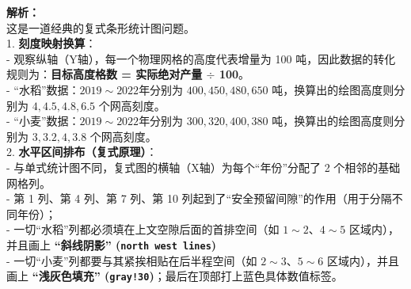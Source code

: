 \begin{center}
\end{center}

\vspace{0.8cm}

{\small\color{gray}
\textbf{解析：}\\
这是一道经典的复式条形统计图问题。\\
1. \textbf{刻度映射换算}：\\
- 观察纵轴（Y轴），每一个物理网格的高度代表增量为 100 吨，因此数据的转化规则为：\textbf{目标高度格数 = 实际绝对产量 $\div$ 100}。\\
- “水稻”数据：$2019\sim 2022$年分别为 $400, 450, 480, 650$ 吨，换算出的绘图高度则分别为 $4, 4.5, 4.8, 6.5$ 个网高刻度。\\
- “小麦”数据：$2019\sim 2022$年分别为 $300, 320, 400, 380$ 吨，换算出的绘图高度则分别为 $3, 3.2, 4, 3.8$ 个网高刻度。\\
2. \textbf{水平区间排布（复式原理）}：\\
- 与单式统计图不同，复式图的横轴（X轴）为每个“年份”分配了 2 个相邻的基础网格列。\\
- 第 1 列、第 4 列、第 7 列、第 10 列起到了“安全预留间隙”的作用（用于分隔不同年份）；\\
- 一切“水稻”列都必须填在上文空隙后面的首排空间（如 $1\sim2$、$4\sim5$ 区域内），并且画上 \textbf{“斜线阴影” (\texttt{north west lines})}\\
- 一切“小麦”列都要与其紧挨相贴在后半程空间（如 $2\sim3$、$5\sim6$ 区域内），并且画上 \textbf{“浅灰色填充” (\texttt{gray!30})}；最后在顶部打上蓝色具体数值标签。
}

